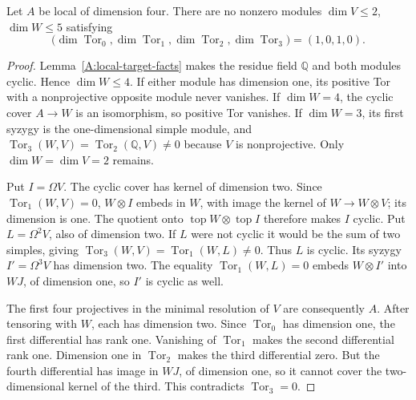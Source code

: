 \begin{lemma}
\label{A:local-four-small-target}
Let $A$ be local of dimension four. There are no nonzero modules
$\dim V\leq2$, $\dim W\leq5$ satisfying
\[
 \bigl(\dim\operatorname{Tor}_0,
       \dim\operatorname{Tor}_1,
       \dim\operatorname{Tor}_2,
       \dim\operatorname{Tor}_3\bigr)=(1,0,1,0).
\]
\end{lemma}
\begin{proof}
Lemma~\ref{A:local-target-facts} makes the residue field
$\mathbb Q$ and both modules cyclic. Hence $\dim W\leq4$.
If either module has dimension one, its positive Tor with a
nonprojective opposite module never vanishes. If $\dim W=4$,
the cyclic cover $A\to W$ is an isomorphism, so positive Tor
vanishes. If $\dim W=3$, its first syzygy is the
one-dimensional simple module, and
$\operatorname{Tor}_3(W,V)=\operatorname{Tor}_2(\mathbb Q,V)
\ne0$ because $V$ is nonprojective. Only
$\dim W=\dim V=2$ remains.

Put $I=\Omega V$. The cyclic cover has kernel of dimension
two. Since $\operatorname{Tor}_1(W,V)=0$,
$W\otimes I$ embeds in $W$, with image the kernel of
$W\to W\otimes V$; its dimension is one. The quotient
onto $\operatorname{top}W\otimes\operatorname{top}I$
therefore makes $I$ cyclic. Put $L=\Omega^2V$, also of
dimension two. If $L$ were not cyclic it would be the sum
of two simples, giving
$\operatorname{Tor}_3(W,V)=\operatorname{Tor}_1(W,L)\ne0$.
Thus $L$ is cyclic. Its syzygy $I'=\Omega^3V$ has dimension
two. The equality $\operatorname{Tor}_1(W,L)=0$ embeds
$W\otimes I'$ into $WJ$, of dimension one, so $I'$ is
cyclic as well.

The first four projectives in the minimal resolution of $V$
are consequently $A$. After tensoring with $W$, each has
dimension two. Since $\operatorname{Tor}_0$ has dimension
one, the first differential has rank one. Vanishing of
$\operatorname{Tor}_1$ makes the second differential rank
one. Dimension one in $\operatorname{Tor}_2$ makes the
third differential zero. But the fourth differential has
image in $WJ$, of dimension one, so it cannot cover the
two-dimensional kernel of the third. This contradicts
$\operatorname{Tor}_3=0$.
\end{proof}

